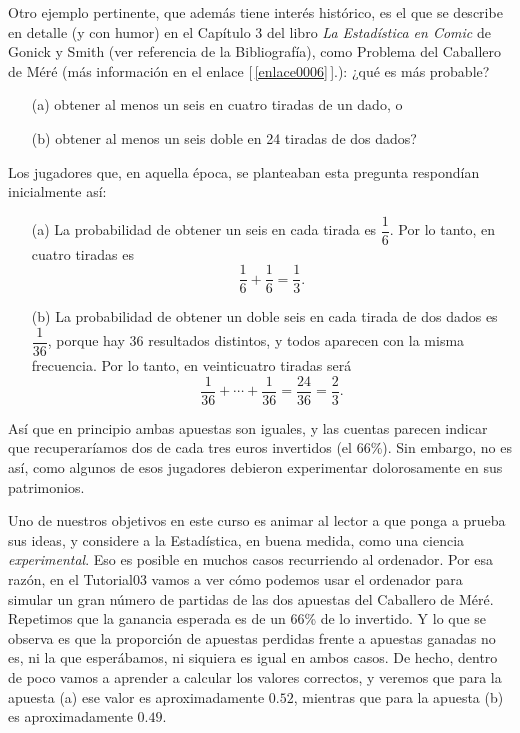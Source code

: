 Otro ejemplo pertinente, que además tiene interés histórico, es el que se describe en detalle (y
con humor) en el Capítulo 3 del libro {\em La Estadística en Comic} de Gonick y Smith (ver
referencia \cite{EstadisticaComic} de la Bibliografía), como {\sf Problema del Caballero de
Méré} (más información en el enlace [\,\ref{enlace0006}\,].\label{enlace0006a}): ¿qué
es más probable?
    \begin{itemize}
    \item[(a)] obtener al menos un seis en cuatro tiradas de un dado, o
    \item[(b)] obtener al menos un seis doble en 24 tiradas de dos dados?
    \end{itemize}
    Los jugadores que, en aquella época, se planteaban esta pregunta respondían inicialmente así:
    \begin{itemize}
    \item[(a)] La probabilidad de obtener un seis en cada tirada es $\dfrac{1}{6}$. Por lo tanto, en cuatro tiradas es
    \[\dfrac{1}{6}+\dfrac{1}{6} = \dfrac{1}{3}.\]

    \item[(b)] La probabilidad de obtener un doble seis en cada tirada de dos dados es $\dfrac{1}{36}$, porque hay 36 resultados distintos, y todos aparecen con la misma frecuencia. Por lo tanto, en veinticuatro tiradas será \[\dfrac{1}{36}+\cdots+\dfrac{1}{36}=\dfrac{24}{36}=\dfrac{2}{3}.\]
    \end{itemize}
Así que en principio ambas apuestas son iguales, y las cuentas parecen indicar que recuperaríamos dos de cada tres euros invertidos (el 66\%). Sin embargo, no es así, como algunos de esos jugadores debieron experimentar dolorosamente en sus patrimonios.

Uno de nuestros objetivos en este curso es animar al lector a que ponga a prueba sus ideas, y considere a la Estadística, en buena medida, como una ciencia {\em experimental}. Eso es posible en muchos casos recurriendo al ordenador. Por esa razón, en el Tutorial03 vamos a ver cómo podemos usar el ordenador para simular un gran número de partidas de las dos apuestas del Caballero de Méré. Repetimos que la ganancia esperada es de un 66\% de lo invertido. Y lo que se observa es que la proporción de apuestas perdidas frente a apuestas ganadas no es, ni la que esperábamos, ni siquiera es igual en ambos casos. De hecho, dentro de poco vamos a aprender a calcular los valores correctos, y veremos que para la apuesta (a) ese valor es aproximadamente $0.52$, mientras que para la apuesta (b) es aproximadamente $0.49$.
%
%


